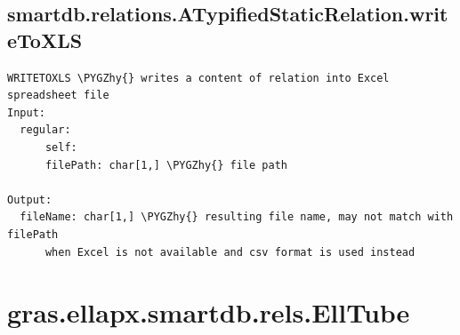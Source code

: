 \documentclass[letterpaper,10pt,english]{sphinxmanual}
\def\PYGZhy{\char`\-}
\begin{document}
\subsection{smartdb.relations.ATypifiedStaticRelation.writeToXLS}
\label{chap_functions:smartdb-relations-atypifiedstaticrelation-writetoxls}
\begin{Verbatim}[commandchars=\\\{\}]
WRITETOXLS \PYGZhy{} writes a content of relation into Excel spreadsheet file
Input:
  regular:
      self:
      filePath: char[1,] \PYGZhy{} file path

Output:
  fileName: char[1,] \PYGZhy{} resulting file name, may not match with filePath
      when Excel is not available and csv format is used instead
\end{Verbatim}


\section{gras.ellapx.smartdb.rels.EllTube}
\label{chap_functions:gras-ellapx-smartdb-rels-elltube}
\end{document}
